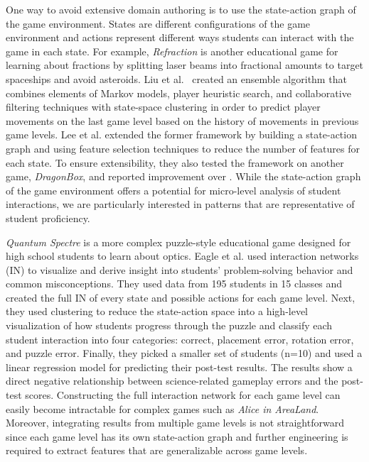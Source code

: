 \documentclass{sigchi}
\begin{document}
	One way to avoid extensive domain authoring is to use the state-action graph of the game environment. 
	States are different configurations of the game environment and actions represent different ways students can interact with the game in each state. For example, \textit {Refraction} \cite{andersen2010gameplay} is another educational game for learning about fractions by splitting laser beams into fractional amounts to target spaceships and avoid asteroids. 
	Liu et al.~\cite{liu2013predicting} created an ensemble algorithm that combines elements of Markov models, player heuristic search, and collaborative filtering techniques with state-space clustering in order to predict player movements on the last game level based on the history of movements in previous game levels. 
	Lee et al. \cite{lee2014learning} extended the former framework by building a state-action graph and using feature selection techniques to reduce the number of features for each state. 
	To ensure extensibility, they also tested the framework on another game, \textit {DragonBox}, and reported improvement over \cite{liu2013predicting}.
	While the state-action graph of the game environment offers a potential for micro-level analysis of student interactions, we are particularly interested in patterns that are representative of student proficiency.
	
	\textit {Quantum Spectre} is a more complex puzzle-style educational game designed for high school students to learn about optics. 
	Eagle et al. \cite{eagle2015measuring} used interaction networks (IN) to visualize and derive insight into students' problem-solving behavior and common misconceptions. 
	They used data from 195 students in 15 classes and created the full IN of every state and possible actions for each game level. 
	Next, they used clustering to reduce the state-action space into a high-level visualization of how students progress through the puzzle and classify each student interaction into four categories: correct, placement error, rotation error, and puzzle error. 
	Finally, they picked a smaller set of students (n=10) and used a linear regression model for predicting their post-test results.
	The results show a direct negative relationship between science-related gameplay errors and the post-test scores.
	Constructing the full interaction network for each game level 
	can easily become intractable for complex games such as \textit{Alice in AreaLand}. Moreover, integrating results from multiple game levels is not straightforward since each game level has its own state-action graph and further engineering is required to extract features that are generalizable across game levels. 
	
\end{document}
